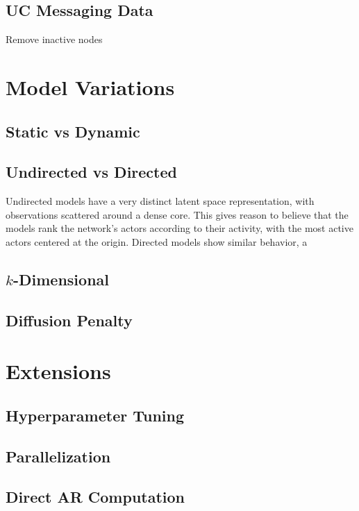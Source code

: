     \subsection{UC Messaging Data}
    
        Remove inactive nodes
    
\section{Model Variations}

    \subsection{Static vs Dynamic}

    \subsection{Undirected vs Directed}
    
        Undirected models have a very distinct latent space representation, with observations scattered around a dense core. This gives reason to believe that the models rank the network's actors according to their activity, with the most active actors centered at the origin. 
        Directed models show similar behavior, a
    
    \subsection{\texorpdfstring{$k$}{k}-Dimensional}
    
    \subsection{Diffusion Penalty}
    
\section{Extensions}
    
    \subsection{Hyperparameter Tuning}
    
    \subsection{Parallelization}

    \subsection{Direct AR Computation}
    
